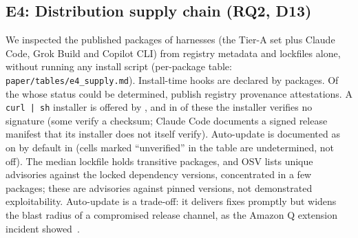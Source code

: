 \subsection{E4: Distribution supply chain (RQ2, D13)}\label{sec:eval-supply}
We inspected the published packages of \eFourHarnesses{} harnesses (the Tier-A set plus Claude Code, Grok Build and Copilot CLI) from registry metadata and lockfiles alone, without running any install script\evD{} (per-package table: \texttt{paper/tables/e4\_supply.md}). Install-time hooks are declared by \eFourHarnessesWithInstallHooks{} packages. Of the \eFourProvenanceKnown{} whose status could be determined, \eFourWithProvenance{} publish registry provenance attestations. A \texttt{curl | sh} installer is offered by \eFourHarnessesWithCurlInstaller{}, and in \eFourHarnessesWithUnsignedCurlInstaller{} of these the installer verifies no signature (some verify a checksum; Claude Code documents a signed release manifest that its installer does not itself verify\evD). Auto-update is documented as on by default in \eFourAutoUpdateDefaultOn{} (cells marked ``unverified'' in the table are undetermined, not off). The median lockfile holds \eFourMedianTransitive{} transitive packages, and OSV lists \eFourOsvUniqueVulnsTotal{} unique advisories against the locked dependency versions, concentrated in a few packages; these are advisories against pinned versions, not demonstrated exploitability. Auto-update is a trade-off: it delivers fixes promptly but widens the blast radius of a compromised release channel, as the Amazon Q extension incident showed\evD~\cite{amazonq2025}.

